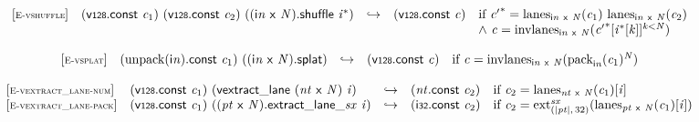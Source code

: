 \vspace{1ex}

$$
\begin{array}{@{}l@{}lcl@{}l@{}}
{[\textsc{\scriptsize E{-}vshuffle}]} \quad & (\mathsf{v{\scriptstyle128}}.\mathsf{const}~{\mathit{c}}_{{1}})~(\mathsf{v{\scriptstyle128}}.\mathsf{const}~{\mathit{c}}_{{2}})~(({\mathsf{i}}{{\mathit{n}}}~\mathsf{x}~{\mathit{N}}).\mathsf{shuffle}~{{\mathit{i}}^\ast}) &\hookrightarrow& (\mathsf{v{\scriptstyle128}}.\mathsf{const}~{\mathit{c}}) &\quad
  \mbox{if}~{{\mathit{c}'}^\ast} = {{\mathrm{lanes}}}_{{\mathsf{i}}{{\mathit{n}}}~\mathsf{x}~{\mathit{N}}}({\mathit{c}}_{{1}})~{{\mathrm{lanes}}}_{{\mathsf{i}}{{\mathit{n}}}~\mathsf{x}~{\mathit{N}}}({\mathit{c}}_{{2}}) \\
 &&&&\quad {\land}~{\mathit{c}} = {{\mathrm{invlanes}}}_{{\mathsf{i}}{{\mathit{n}}}~\mathsf{x}~{\mathit{N}}}({{{\mathit{c}'}^\ast}{}[{{\mathit{i}}^\ast}{}[{\mathit{k}}]]^{{\mathit{k}}<{\mathit{N}}}}) \\
\end{array}
$$

\vspace{1ex}

$$
\begin{array}{@{}l@{}lcl@{}l@{}}
{[\textsc{\scriptsize E{-}vsplat}]} \quad & ({\mathrm{unpack}}({\mathsf{i}}{{\mathit{n}}}).\mathsf{const}~{\mathit{c}}_{{1}})~(({\mathsf{i}}{{\mathit{n}}}~\mathsf{x}~{\mathit{N}}).\mathsf{splat}) &\hookrightarrow& (\mathsf{v{\scriptstyle128}}.\mathsf{const}~{\mathit{c}}) &\quad
  \mbox{if}~{\mathit{c}} = {{\mathrm{invlanes}}}_{{\mathsf{i}}{{\mathit{n}}}~\mathsf{x}~{\mathit{N}}}({{{\mathrm{pack}}}_{{\mathsf{i}}{{\mathit{n}}}}({\mathit{c}}_{{1}})^{{\mathit{N}}}}) \\
\end{array}
$$

\vspace{1ex}

$$
\begin{array}{@{}l@{}lcl@{}l@{}}
{[\textsc{\scriptsize E{-}vextract\_lane{-}num}]} \quad & (\mathsf{v{\scriptstyle128}}.\mathsf{const}~{\mathit{c}}_{{1}})~(\mathsf{vextract\_lane}~({\mathit{nt}}~\mathsf{x}~{\mathit{N}})~{\mathit{i}}) &\hookrightarrow& ({\mathit{nt}}.\mathsf{const}~{\mathit{c}}_{{2}}) &\quad
  \mbox{if}~{\mathit{c}}_{{2}} = {{\mathrm{lanes}}}_{{\mathit{nt}}~\mathsf{x}~{\mathit{N}}}({\mathit{c}}_{{1}}){}[{\mathit{i}}] \\
{[\textsc{\scriptsize E{-}vextract\_lane{-}pack}]} \quad & (\mathsf{v{\scriptstyle128}}.\mathsf{const}~{\mathit{c}}_{{1}})~({({\mathit{pt}}~\mathsf{x}~{\mathit{N}}).\mathsf{extract\_lane\_}}{{\mathit{sx}}}~{\mathit{i}}) &\hookrightarrow& (\mathsf{i{\scriptstyle32}}.\mathsf{const}~{\mathit{c}}_{{2}}) &\quad
  \mbox{if}~{\mathit{c}}_{{2}} = {{{{\mathrm{ext}}}_{({|{\mathit{pt}}|},\, 32)}^{{\mathit{sx}}}}}{({{\mathrm{lanes}}}_{{\mathit{pt}}~\mathsf{x}~{\mathit{N}}}({\mathit{c}}_{{1}}){}[{\mathit{i}}])} \\
\end{array}
$$

